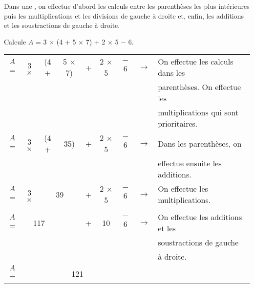 
\begin{aconnaitre}
Dans une , on effectue d'abord les calculs entre les parenthèses les plus intérieures puis les multiplications et les divisions de gauche à droite et, enfin, les additions et les soustractions de gauche à droite.
\end{aconnaitre}

\begin{methode*1}

\begin{exemple*1}
Calcule $A$ = 3 $\times$ (4 + 5 $\times$ 7) + 2 $\times$ 5 $-$ 6.

\begin{center}
\begin{tabularx}{1.2\linewidth}{ccccccccX}
$A$=	 	& 3 $\times$	& (4 +	& 5 $\times$ 7)	& + & 2 $\times$  5	& $-$ 6	& $\rightarrow$ & On effectue les calculs dans les \\ \cline{4-4}
&&&&&&&&  parenthèses. On effectue les\\
&&&&&&&& multiplications qui sont prioritaires. \\
$A$= 	& 3 $\times$  	& (4 + 	&  35)  		&+ & 2 $\times$  5 	&$-$ 6  	& $\rightarrow$ & Dans les parenthèses, on \\ \cline{3-4}
 &&&&&&&& effectue ensuite les additions.\\
$A$= 	& 3 $\times$  	&    \multicolumn{2}{c}{39}      		     		& + & 2 $\times$  5 	&$-$ 6  	& $\rightarrow$ & On effectue les multiplications.\\ \cline{2-3}\cline{6-6}
 &&&&&&&& \\
$A$= 	&      		\multicolumn{2}{c}{117} &             			& +  & 10  			& $-$6  	& $\rightarrow$ & On effectue les additions et les \\ \cline{2-7}
 &&&&&&&& soustractions de gauche\\
 &&&&&&&& à droite.\\
$A$= 	&                \multicolumn{6}{c}{121}                             								&  & \\
\end{tabularx}
\end{center}
\end{exemple*1}




\end{methode*1}
